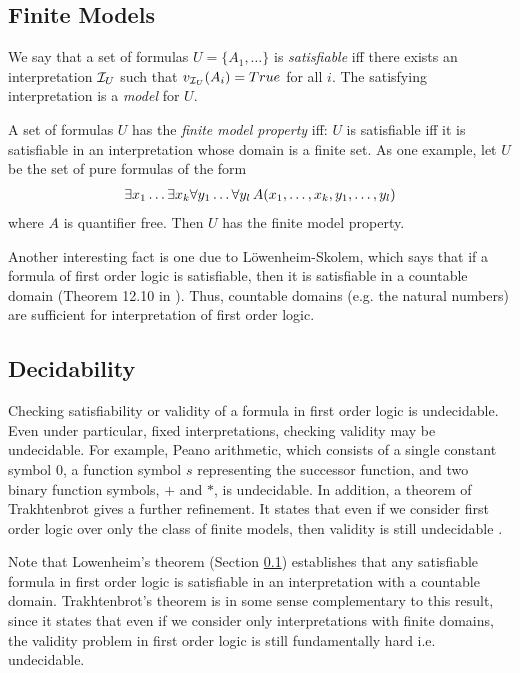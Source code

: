 \documentclass[10pt]{article}
\begin{document}
\subsection{Finite Models}
\label{sec:finite-models}

We say that a set of formulas $U=\{A_1,\dots\}$ is \textit{satisfiable} iff there exists an interpretation $\mathcal{I}_U$ such that $v_{\mathcal{I}_U}(A_i)=True$ for all $i$. The satisfying interpretation is a \textit{model} for $U$. 

A set of formulas $U$ has the \textit{finite model property} iff: $U$ is satisfiable iff it is satisfiable in an interpretation whose domain is a finite set. As one example, let $U$ be the set of pure formulas of the form 
\begin{align*}
    \exists x_1 \dots \exists x_k \forall y_1 \dots \forall y_l \, A(x_1,\dots,x_k,y_1,\dots,y_l)
\end{align*}
where $A$ is quantifier free. Then $U$ has the finite model property.

Another interesting fact is one due to L\"{o}wenheim-Skolem, which says that if a formula of first order logic is satisfiable, then it is satisfiable in a countable domain (Theorem 12.10 in \cite{2012benari}). Thus, countable domains (e.g. the natural numbers) are sufficient for interpretation of first order logic.

\subsection{Decidability}

Checking satisfiability or validity of a formula in first order logic is undecidable. Even under particular, fixed interpretations, checking validity may be undecidable. For example, Peano arithmetic, which consists of a single constant symbol $0$, a function symbol $s$ representing the successor function, and two binary function symbols, $+$ and $*$, is undecidable. In addition, a theorem of Trakhtenbrot gives a further refinement. It states that even if we consider first order logic over only the class of finite models, then validity is still undecidable \cite{libkin2004elements}. 

Note that Lowenheim's theorem (Section \ref{sec:finite-models}) establishes that any satisfiable formula in first order logic is satisfiable in an interpretation with a countable domain. Trakhtenbrot's theorem is in some sense complementary to this result, since it states that even if we consider only interpretations with finite domains, the validity problem in first order logic is still fundamentally hard i.e. undecidable.
\end{document}

